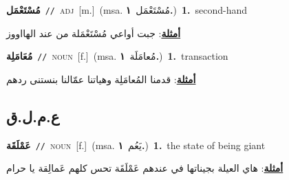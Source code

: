 \documentclass[10pt,a4paper,twoside]{article} %
\begin{document}
\begin{multicols}{2}
{\setlength\topsep{0pt}\textbf{\foreignlanguage{arabic}{مُسْتَعْمَل}}\ {\color{gray}\texttt{//}\color{black}}\ \textsc{adj}\ [m.]\ \color{gray}(msa. \foreignlanguage{arabic}{مُسْتَعْمَل}~\foreignlanguage{arabic}{\textbf{١.}})\color{black}\ \textbf{1.}~second-hand\  \begin{flushright}\color{gray}\foreignlanguage{arabic}{\textbf{\underline{\foreignlanguage{arabic}{أمثلة}}}: جبت أواعي مُسْتَعْمَلة من عند الهااووز}\end{flushright}\color{black}} \vspace{2mm}

{\setlength\topsep{0pt}\textbf{\foreignlanguage{arabic}{مُعَامَلِة}}\ {\color{gray}\texttt{//}\color{black}}\ \textsc{noun}\ [f.]\ \color{gray}(msa. \foreignlanguage{arabic}{مُعامَلَة}~\foreignlanguage{arabic}{\textbf{١.}})\color{black}\ \textbf{1.}~transaction\  \begin{flushright}\color{gray}\foreignlanguage{arabic}{\textbf{\underline{\foreignlanguage{arabic}{أمثلة}}}: قدمنا المُعامَلِة وهياتنا عمّالنا بنستنى ردهم}\end{flushright}\color{black}} \vspace{2mm}

\vspace{-3mm}
\subsection*{\color{blue}\foreignlanguage{arabic}{ع.م.ل.ق}\color{blue}{}} 

{\setlength\topsep{0pt}\textbf{\foreignlanguage{arabic}{عَمْلَقَة}}\ {\color{gray}\texttt{//}\color{black}}\ \textsc{noun}\ [f.]\ \color{gray}(msa. \foreignlanguage{arabic}{يَعُم}~\foreignlanguage{arabic}{\textbf{١.}})\color{black}\ \textbf{1.}~the state of being giant\  \begin{flushright}\color{gray}\foreignlanguage{arabic}{\textbf{\underline{\foreignlanguage{arabic}{أمثلة}}}: هاي العيلة بجيناتها في عندهم عَمْلَقَة تحس كلهم عَمالِقة يا حرام}\end{flushright}\color{black}} \vspace{2mm}


\end{multicols}
\end{document}
